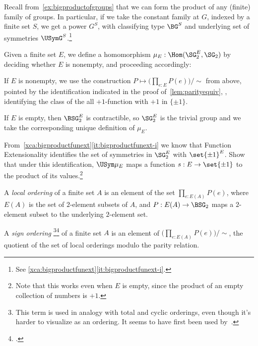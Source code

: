 Recall from~\cref{ex:bigproductofgroups} that we can form the
product of any (finite) family of groups.
In particular, if we take the constant family at $G$,
indexed by a finite set $S$, we get a power $G^S$,
with classifying type $\BG^S$ and underlying set of symmetries
$\USymG^S$.\footnote{See \cref{xca:bigproductfunext}\ref{it:bigproductfunext-i}.}

\begin{definition}\label{def:mu_E}
  Given a finite set $E$, we define a homomorphism 
  $\mu_E : \Hom(\SG_2^E,\SG_2)$ by deciding whether $E$
  is nonempty, and proceeding accordingly:

  If $E$ is nonempty, we use the construction
  $P \mapsto \bigl(\prod_{e:E}P(e)\bigr)/\sim$ from above,
  pointed by the identification indicated in the proof of~\cref{lem:parityequiv},
  \ie, identifying the class of the all $+1$-function with $+1$ in $\{\pm1\}$.

  If $E$ is empty, then $\BSG_2^E$ is contractible, so $\SG_2^E$ is the trivial group
  and we take the corresponding unique definition of $\mu_E$.
\end{definition}

\begin{xca}
  From~\cref{xca:bigproductfunext}\ref{it:bigproductfunext-i}
  we know that Function Extensionality identifies the set of 
  symmetries in $\SG_2^E$ with $\set{\pm1}^E$.
  Show that under this identification, $\USym\mu_E$
  maps a function $s : E \to \set{\pm1}$
  to the product of its values.\footnote{%
    Note that this works even when $E$ is empty,
    since the product of an empty collection of numbers is $+1$.}
\end{xca}

\begin{definition}\label{def:sign-ordering}
  A \emph{local ordering} of a finite set $A$
  is an element of the set $\prod_{e:E(A)}P(e)$,
  where $E(A)$ is the set of $2$-element subsets of $A$,
  and $P : E(A) \to \BSG_2$ maps a $2$-element subset to the underlying $2$-element set.

  A \emph{sign ordering}%
  \footnote{This term is used in analogy with total and cyclic orderings,
    even though it's harder to visualize as an ordering.
    It seems to have first been used
    by~\citeauthor{Kuperberg1996}\footnotemark{}.}\footcitetext{Kuperberg1996}
  of a finite set $A$ is an element of
  $\bigl(\prod_{e:E(A)}P(e)\bigr)/\sim$,
  \ie the quotient of the set of local orderings
  modulo the parity relation.
\end{definition}

